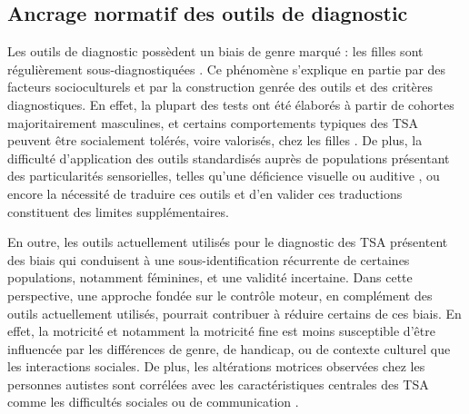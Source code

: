 \subsection{Ancrage normatif des outils de diagnostic}\label{sec:norme}

Les outils de diagnostic possèdent un biais de genre marqué : les filles sont régulièrement sous-diagnostiquées \parencite{Gupta2025Jan, Lai2023Dec, Rea2023Jul}. Ce phénomène s'explique en partie par des facteurs socioculturels et par la construction genrée des outils et des critères diagnostiques. En effet, la plupart des tests ont été élaborés à partir de cohortes majoritairement masculines, et certains comportements typiques des TSA peuvent être socialement tolérés, voire valorisés, chez les filles \parencite{Lai2023Dec}. De plus, la difficulté d'application des outils standardisés auprès de populations présentant des particularités sensorielles, telles qu'une déficience visuelle ou auditive \parencite{Hirota2023Jan}, ou encore la nécessité de traduire ces outils et d'en valider ces traductions constituent des limites supplémentaires.

\medskip

En outre, les outils actuellement utilisés pour le diagnostic des TSA présentent des biais %
qui conduisent à une sous-identification récurrente de certaines populations, notamment féminines, et une validité incertaine. Dans cette perspective, une approche fondée sur le contrôle moteur, en complément des outils actuellement utilisés, pourrait contribuer à réduire certains de ces biais. En effet, la motricité et notamment la motricité fine est moins susceptible d'être influencée par les différences de genre, de handicap, ou de contexte culturel que les interactions sociales. De plus, les altérations motrices observées chez les personnes autistes sont corrélées avec les caractéristiques centrales des TSA comme les difficultés sociales ou de communication \parencite{hocking_what_2017}. 

